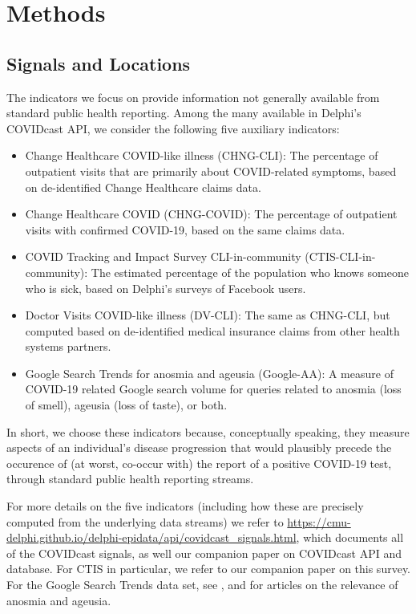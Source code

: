 \documentclass[9pt,twocolumn,twoside,lineno]{pnas-new}
\begin{document}
\section{Methods}

\subsection{Signals and Locations}

The indicators we focus on provide information not generally available from
standard public health reporting. Among the many available in Delphi's COVIDcast
API, we consider the following five auxiliary indicators: 
\begin{itemize}
\item Change Healthcare COVID-like illness (CHNG-CLI): The percentage of
  outpatient visits that are primarily about COVID-related symptoms, based on
  de-identified Change Healthcare claims data.
\item Change Healthcare COVID (CHNG-COVID): The percentage of outpatient visits
  with confirmed COVID-19, based on the same claims data.
\item COVID Tracking and Impact Survey CLI-in-community (CTIS-CLI-in-community): 
  The estimated percentage of the population who knows someone who is sick,
  based on Delphi's surveys of Facebook users.
\item Doctor Visits COVID-like illness (DV-CLI): The same as CHNG-CLI, but
  computed based on de-identified medical insurance claims from other health
  systems partners.  
\item Google Search Trends for anosmia and ageusia (Google-AA): A measure of 
  COVID-19 related Google search volume for queries related to anosmia (loss of
  smell), ageusia (loss of taste), or both.  
\end{itemize}
In short, we choose these indicators because, conceptually speaking, they
measure aspects of an individual's disease progression that would plausibly
precede the occurence of (at worst, co-occur  with) the report of a positive
COVID-19 test, through standard public health reporting streams.  

For more details on the five indicators (including how these are precisely
computed from the underlying data streams) we refer to
\url{https://cmu-delphi.github.io/delphi-epidata/api/covidcast_signals.html},
which documents all of the COVIDcast signals, as well our companion paper on 
COVIDcast API and database. For CTIS in particular, we refer to our companion 
paper on this survey. For the Google Search Trends data set, see
\cite{GoogleSymptoms}, and \cite{Klopfen:2020, Vaira:2020} for articles on the
relevance of anosmia and ageusia.  
\end{document}
